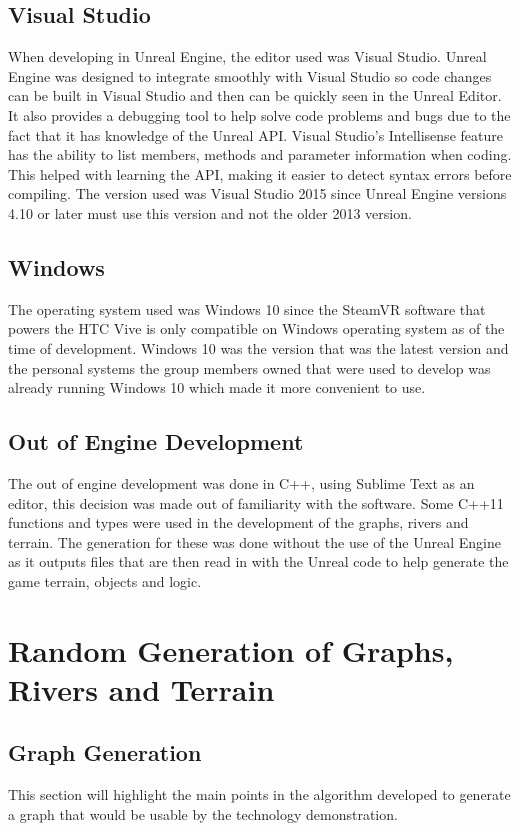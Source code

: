 \subsection{Visual Studio}
When developing in Unreal Engine, the editor used was Visual Studio. Unreal Engine was designed to integrate smoothly with Visual Studio so code changes can be built in Visual Studio and then can be quickly seen in the Unreal Editor. It also provides a debugging tool to help solve code problems and bugs due to the fact that it has knowledge of the Unreal API. Visual Studio's Intellisense feature has the ability to list members, methods and parameter information when coding. This helped with learning the API, making it easier to detect syntax errors before compiling. The version used was Visual Studio 2015 since Unreal Engine versions 4.10 or later must use this version and not the older 2013 version.

\subsection{Windows}
The operating system used was Windows 10 since the SteamVR software that powers the HTC Vive is only compatible on Windows operating system as of the time of development. Windows 10 was the version that was the latest version and the personal systems the group members owned that were used to develop was already running Windows 10 which made it more convenient to use.

\subsection{Out of Engine Development}
The out of engine development was done in C++, using Sublime Text as an editor, this decision was made out of familiarity with the software. Some C++11 functions and types were used in the development of the graphs, rivers and terrain. The generation for these was done without the use of the Unreal Engine as it outputs files that are then read in with the Unreal code to help generate the game terrain, objects and logic.

\section{Random Generation of Graphs, Rivers and Terrain}

\subsection{Graph Generation}\label{subsec:graphGen}
	This section will highlight the main points in the algorithm developed to generate a graph that would be usable by the technology demonstration.

